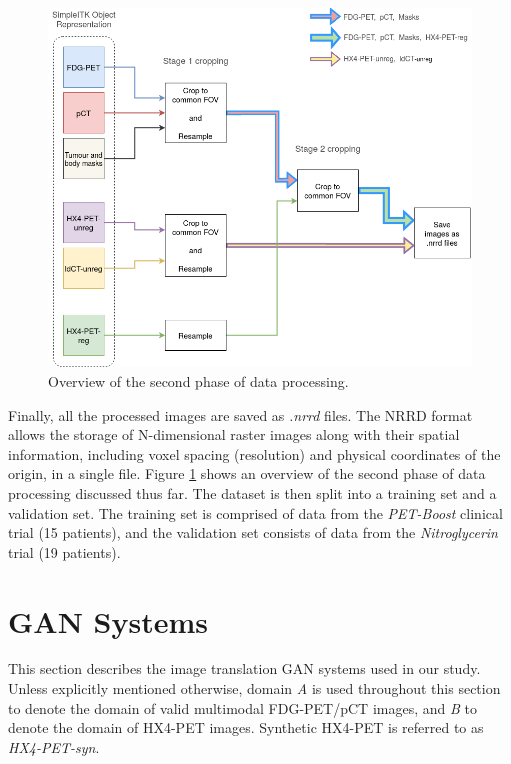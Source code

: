 \begin{figure}[h!]
    \centering
    \includegraphics[width=0.8\linewidth]{figures/Data/data_processing_overview-step_2.png}
    \caption{Overview of the second phase of data processing.}
    \label{fig:data_proc_overview_2}
\end{figure}

Finally, all the processed images are saved as \textit{.nrrd} files. The NRRD format allows the storage of N-dimensional raster images along with their spatial information, including voxel spacing (resolution) and physical coordinates of the origin, in a single file. Figure \ref{fig:data_proc_overview_2} shows an overview of the second phase of data processing discussed thus far. The dataset is then split into a training set and a validation set. The training set is comprised of data from the \textit{PET-Boost} clinical trial (15 patients), and the validation set consists of data from the \textit{Nitroglycerin} trial (19 patients). 



\section{GAN Systems}
\label{GAN_Systems}
This section describes the image translation GAN systems used in our study. Unless explicitly mentioned otherwise, domain \textit{A} is used throughout this section to denote the domain of valid multimodal FDG-PET/pCT images, and \textit{B} to denote the domain of HX4-PET images. Synthetic HX4-PET is referred to as \textit{HX4-PET-syn}.


